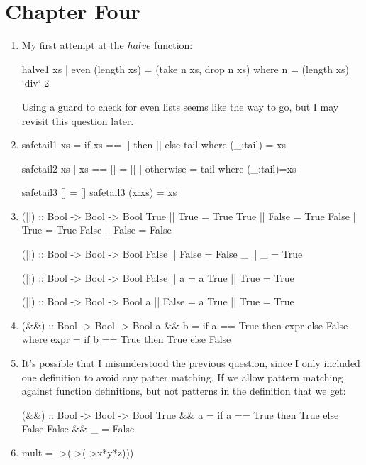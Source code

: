 \documentclass{article}
\begin{document}
\section{Chapter Four}
\begin{enumerate}
\item My first attempt at the $halve$ function:
\begin{code}
halve1 xs | even (length xs) = (take n xs, drop n xs) where n = (length xs) `div` 2
\end{code}
Using a guard to check for even lists seems like the way to go, but I may revisit this question later.

\item 
\begin{code}
safetail1 xs = if xs == [] then [] else tail where (_:tail) = xs

safetail2 xs | xs == []  = []
             | otherwise = tail where (_:tail)=xs
             
safetail3 []     = []
safetail3 (x:xs) = xs
\end{code}

\item
\begin{code}
(||) :: Bool -> Bool -> Bool
True  || True  = True
True  || False = True
False || True  = True
False || False = False

(||) :: Bool -> Bool -> Bool
False || False = False
_     ||    _  = True 

(||) :: Bool -> Bool -> Bool
False || a    = a
True  || True = True

(||) :: Bool -> Bool -> Bool
a    || False = a
True || True  = True
\end{code}

\item 
\begin{code}
(&&) :: Bool -> Bool -> Bool
a && b = if a == True then expr else False
 	 where
            expr = if b == True then True else False
\end{code}

\item It's possible that I misunderstood the previous question, since I only included one definition to avoid any patter matching. If we allow pattern matching against function definitions, but not patterns in the definition that we get:
\begin{code}
(&&) :: Bool -> Bool -> Bool
True && a  = if a == True then True else False
False && _ = False
\end{code}

\item 
\begin{code}
mult = \x->(\y->(\z->x*y*z)))
\end{code}


\end{enumerate}
\end{document}
